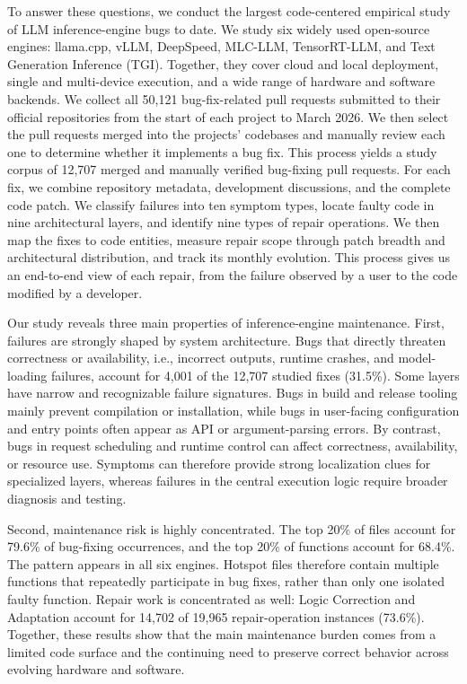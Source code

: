 To answer these questions, we conduct the largest code-centered empirical study of LLM inference-engine bugs to date. We study six widely used open-source engines: llama.cpp, vLLM, DeepSpeed, MLC-LLM, TensorRT-LLM, and Text Generation Inference (TGI). Together, they cover cloud and local deployment, single and multi-device execution, and a wide range of hardware and software backends. We collect all 50,121 bug-fix-related pull requests submitted to their official repositories from the start of each project to March 2026. We then select the pull requests merged into the projects' codebases and manually review each one to determine whether it implements a bug fix. This process yields a study corpus of 12,707 merged and manually verified bug-fixing pull requests. For each fix, we combine repository metadata, development discussions, and the complete code patch. We classify failures into ten symptom types, locate faulty code in nine architectural layers, and identify nine types of repair operations. We then map the fixes to code entities, measure repair scope through patch breadth and architectural distribution, and track its monthly evolution. This process gives us an end-to-end view of each repair, from the failure observed by a user to the code modified by a developer.

Our study reveals three main properties of inference-engine maintenance. First, failures are strongly shaped by system architecture. Bugs that directly threaten correctness or availability, i.e., incorrect outputs, runtime crashes, and model-loading failures, account for 4,001 of the 12,707 studied fixes (31.5\%). Some layers have narrow and recognizable failure signatures. Bugs in build and release tooling mainly prevent compilation or installation, while bugs in user-facing configuration and entry points often appear as API or argument-parsing errors. By contrast, bugs in request scheduling and runtime control can affect correctness, availability, or resource use. Symptoms can therefore provide strong localization clues for specialized layers, whereas failures in the central execution logic require broader diagnosis and testing.

Second, maintenance risk is highly concentrated. The top 20\% of files account for 79.6\% of bug-fixing occurrences, and the top 20\% of functions account for 68.4\%. The pattern appears in all six engines. Hotspot files therefore contain multiple functions that repeatedly participate in bug fixes, rather than only one isolated faulty function. Repair work is concentrated as well: Logic Correction and Adaptation account for 14,702 of 19,965 repair-operation instances (73.6\%). Together, these results show that the main maintenance burden comes from a limited code surface and the continuing need to preserve correct behavior across evolving hardware and software.

